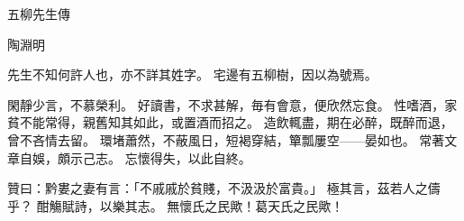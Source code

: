 五柳先生傳

陶淵明

先生不知何許人也，亦不詳其姓字。
宅邊有五柳樹，因以為號焉。

閑靜少言，不慕榮利。
好讀書，不求甚解，毎有會意，便欣然忘食。
性嗜酒，家貧不能常得，親舊知其如此，或置酒而招之。
造飲輒盡，期在必醉，既醉而退，曾不吝情去留。
環堵蕭然，不蔽風日，短褐穿結，簞瓢屢空——晏如也。
常著文章自娛，頗示己志。
忘懷得失，以此自終。

贊曰：黔婁之妻有言：「不戚戚於貧賤，不汲汲於富貴。」
極其言，茲若人之儔乎？
酣觴賦詩，以樂其志。
無懷氏之民歟！葛天氏之民歟！

